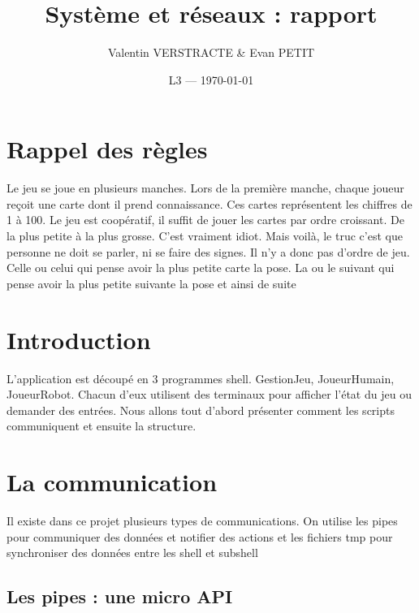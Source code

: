 \documentclass{article}
\title{Système et réseaux : rapport} %
\author{Valentin VERSTRACTE \& Evan PETIT}
\date{L3 --- \today} %
\begin{document}
\maketitle %

\bigskip
\bigskip
\renewcommand{\contentsname}{Table des matières}
\tableofcontents

\bigskip
\bigskip

\section*{Rappel des règles}
%
Le jeu se joue en plusieurs manches. Lors de la première manche,
chaque joueur reçoit une carte dont il prend connaissance. Ces cartes représentent les chiffres de 1 à 100. Le jeu est coopératif, il suffit de jouer les cartes par ordre croissant. De la plus petite à la plus grosse. C’est vraiment idiot. Mais voilà, le truc c’est que personne ne doit se parler, ni se faire des signes. Il n’y a donc pas d’ordre de jeu. Celle ou celui qui pense avoir la plus petite carte la pose. La ou le suivant qui pense avoir la plus petite suivante la pose et ainsi de suite

\section*{Introduction}
%
L'application est découpé en 3 programmes shell. GestionJeu, JoueurHumain, JoueurRobot. Chacun d'eux utilisent des terminaux pour afficher l'état du jeu ou demander des entrées. Nous allons tout d'abord présenter comment les scripts communiquent et ensuite la structure.

\newpage


\section{La communication}

Il existe dans ce projet plusieurs types de communications. On utilise les pipes pour communiquer des données et notifier des actions et les fichiers tmp pour synchroniser des données entre les shell et subshell  

\subsection{Les pipes : une micro API}
\end{document}
